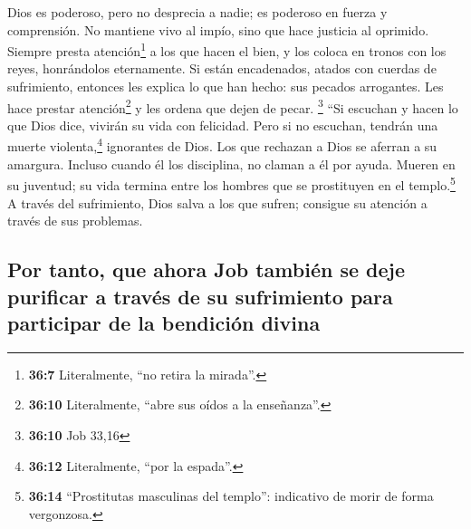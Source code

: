  Dios es poderoso, pero no desprecia a nadie; es poderoso
en fuerza y comprensión.  No mantiene vivo al impío, sino
que hace justicia al oprimido.  Siempre presta
atención\footnote{\textbf{36:7} Literalmente, ``no retira la mirada''.}
a los que hacen el bien, y los coloca en tronos con los reyes,
honrándolos eternamente.  Si están encadenados, atados con
cuerdas de sufrimiento,  entonces les explica lo que han
hecho: sus pecados arrogantes.  Les hace prestar
atención\footnote{\textbf{36:10} Literalmente, ``abre sus oídos a la
  enseñanza''.} y les ordena que dejen de pecar. \footnote{\textbf{36:10}
  Job 33,16}  ``Si escuchan y hacen lo que Dios dice,
vivirán su vida con felicidad.  Pero si no escuchan,
tendrán una muerte violenta,\footnote{\textbf{36:12} Literalmente, ``por
  la espada''.} ignorantes de Dios.  Los que rechazan a
Dios se aferran a su amargura. Incluso cuando él los disciplina, no
claman a él por ayuda.  Mueren en su juventud; su vida
termina entre los hombres que se prostituyen en el templo.\footnote{\textbf{36:14}
  ``Prostitutas masculinas del templo'': indicativo de morir de forma
  vergonzosa.}  A través del sufrimiento, Dios salva a
los que sufren; consigue su atención a través de sus problemas.

\hypertarget{por-tanto-que-ahora-job-tambiuxe9n-se-deje-purificar-a-travuxe9s-de-su-sufrimiento-para-participar-de-la-bendiciuxf3n-divina}{%
\subsection{Por tanto, que ahora Job también se deje purificar a través
de su sufrimiento para participar de la bendición
divina}\label{por-tanto-que-ahora-job-tambiuxe9n-se-deje-purificar-a-travuxe9s-de-su-sufrimiento-para-participar-de-la-bendiciuxf3n-divina}}

